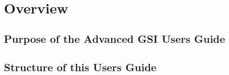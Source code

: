 \chapter{Overview}

\section{Purpose of the Advanced GSI User\textquotesingle s Guide}

\section{Structure of this User\textquotesingle s Guide}



